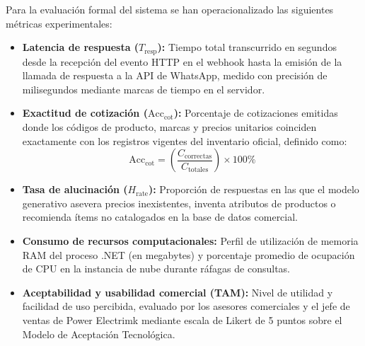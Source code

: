 Para la evaluación formal del sistema se han operacionalizado las siguientes métricas experimentales:
\begin{itemize}
    \item \textbf{Latencia de respuesta ($T_{\text{resp}}$):} Tiempo total transcurrido en segundos desde la recepción del evento HTTP en el webhook hasta la emisión de la llamada de respuesta a la API de WhatsApp, medido con precisión de milisegundos mediante marcas de tiempo en el servidor.
    \item \textbf{Exactitud de cotización ($\text{Acc}_{\text{cot}}$):} Porcentaje de cotizaciones emitidas donde los códigos de producto, marcas y precios unitarios coinciden exactamente con los registros vigentes del inventario oficial, definido como:
    \begin{equation}
        \text{Acc}_{\text{cot}} = \left( \frac{C_{\text{correctas}}}{C_{\text{totales}}} \right) \times 100\%
    \end{equation}
    \item \textbf{Tasa de alucinación ($H_{\text{rate}}$):} Proporción de respuestas en las que el modelo generativo asevera precios inexistentes, inventa atributos de productos o recomienda ítems no catalogados en la base de datos comercial.
    \item \textbf{Consumo de recursos computacionales:} Perfil de utilización de memoria RAM del proceso .NET (en megabytes) y porcentaje promedio de ocupación de CPU en la instancia de nube durante ráfagas de consultas.
    \item \textbf{Aceptabilidad y usabilidad comercial (TAM):} Nivel de utilidad y facilidad de uso percibida, evaluado por los asesores comerciales y el jefe de ventas de Power Electrimk mediante escala de Likert de 5 puntos sobre el Modelo de Aceptación Tecnológica.
\end{itemize}
